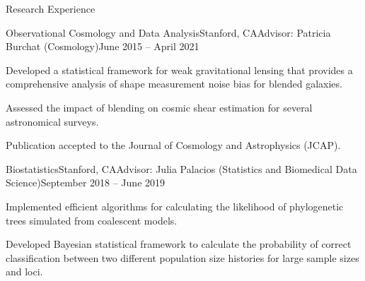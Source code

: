 \begin{rSection}{Research Experience}
\begin{rSubsection}{Observational Cosmology and Data Analysis}{Stanford, CA}{Advisor: Patricia Burchat (Cosmology)}{June 2015 -- April 2021}
\item Developed a statistical framework for weak gravitational lensing that provides a comprehensive analysis of shape measurement noise bias for blended galaxies.
\item Assessed the impact of blending on cosmic shear estimation for several astronomical surveys.
\item Publication accepted to the Journal of Cosmology and Astrophysics (JCAP). 
\end{rSubsection}

\begin{rSubsection}{Biostatistics}{Stanford, CA}{Advisor: Julia Palacios (Statistics and Biomedical Data Science)}{September 2018 -- June 2019}
\item Implemented efficient algorithms for calculating the likelihood of phylogenetic trees simulated from coalescent models.

\item Developed Bayesian statistical framework to calculate the probability of correct classification between two different population size histories for large sample sizes and loci. 


\end{rSubsection}


\end{rSection}
